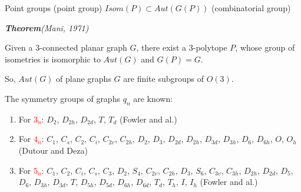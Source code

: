 \documentclass[%
pdf,
colorBG,
slideColor,
]{prosper}
\begin{document}





\begin{slide}{Point groups}
(point group) $Isom(P)\subset Aut(G(P))$ (combinatorial group)

{\em {\bf Theorem}(Mani, 1971)

Given a $3$-connected planar graph $G$, there exist a $3$-polytope $P$, whose group of isometries is isomorphic to $Aut(G)$ and $G(P)=G$.
}

\vspace{3mm}

So, $Aut(G)$ of plane graphs $G$ are finite subgroups of $O(3)$.

The symmetry groups of graphs $q_n$ are known:

\begin{enumerate}
\item[\ding{108}] For \textcolor{red}{$3_n$}: $D_{2}$, $D_{2h}$, $D_{2d}$, $T$, $T_d$ (Fowler and al.)

\item[\ding{108}] For \textcolor{red}{$4_n$}: $C_1$, $C_s$, $C_2$, $C_{i}$, $C_{2v}$, $C_{2h}$, $D_2$, $D_3$, $D_{2d}$, $D_{2h}$, $D_{3d}$, $D_{3h}$, $D_6$, $D_{6h}$, $O$, $O_h$ (Dutour and Deza)
\item[\ding{108}] For \textcolor{red}{$5_n$}: $C_1$, $C_2$, $C_i$, $C_s$, $C_3$, $D_2$, $S_4$, $C_{2v}$, $C_{2h}$, $D_3$, $S_6$, $C_{3v}$, $C_{3h}$, $D_{2h}$, $D_{2d}$, $D_5$, $D_6$, $D_{3h}$, $D_{3d}$, $T$, $D_{5h}$, $D_{5d}$, $D_{6h}$, $D_{6d}$, $T_d$, $T_h$, $I$, $I_h$ (Fowler and al.)
\end{enumerate}

\end{slide}
\end{document}
